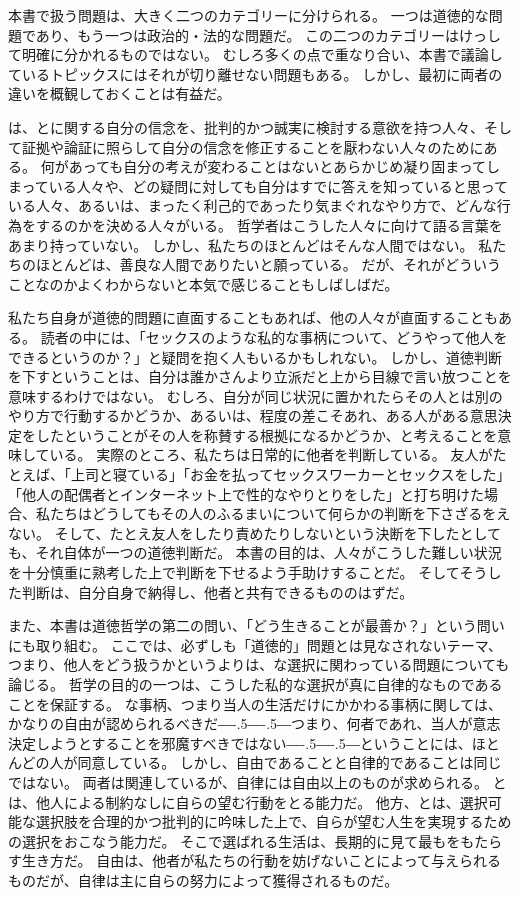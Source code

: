 \documentclass[paper=a4,book,openany]{jlreq}
\def\DDASH{―\kern-.5\zw―\kern-.5\zw―}
\begin{document}
本書で扱う問題は、大きく二つのカテゴリーに分けられる。
一つは道徳的な問題であり、もう一つは政治的・法的な問題だ。
この二つのカテゴリーはけっして明確に分かれるものではない。
むしろ多くの点で重なり合い、本書で議論しているトピックスにはそれが切り離せない問題もある。
しかし、最初に両者の違いを概観しておくことは有益だ。

は、とに関する自分の信念を、批判的かつ誠実に検討する意欲を持つ人々、そして証拠や論証に照らして自分の信念を修正することを厭わない人々のためにある。
何があっても自分の考えが変わることはないとあらかじめ凝り固まってしまっている人々や、どの疑問に対しても自分はすでに答えを知っていると思っている人々、あるいは、まったく利己的であったり気まぐれなやり方で、どんな行為をするのかを決める人々がいる。
哲学者はこうした人々に向けて語る言葉をあまり持っていない。
しかし、私たちのほとんどはそんな人間ではない。
私たちのほとんどは、善良な人間でありたいと願っている。
だが、それがどういうことなのかよくわからないと本気で感じることもしばしばだ。

私たち自身が道徳的問題に直面することもあれば、他の人々が直面することもある。
読者の中には、「セックスのような私的な事柄について、どうやって他人をできるというのか？」と疑問を抱く人もいるかもしれない。
しかし、道徳判断を下すということは、自分は誰かさんより立派だと上から目線で言い放つことを意味するわけではない。
むしろ、自分が同じ状況に置かれたらその人とは別のやり方で行動するかどうか、あるいは、程度の差こそあれ、ある人がある意思決定をしたということがその人を称賛する根拠になるかどうか、と考えることを意味している。
実際のところ、私たちは日常的に他者を判断している。
友人がたとえば、「上司と寝ている」「お金を払ってセックスワーカーとセックスをした」「他人の配偶者とインターネット上で性的なやりとりをした」と打ち明けた場合、私たちはどうしてもその人のふるまいについて何らかの判断を下さざるをえない。
そして、たとえ友人をしたり責めたりしないという決断を下したとしても、それ自体が一つの道徳判断だ。
本書の目的は、人々がこうした難しい状況を十分慎重に熟考した上で判断を下せるよう手助けすることだ。
そしてそうした判断は、自分自身で納得し、他者と共有できるもののはずだ。

また、本書は道徳哲学の第二の問い、「どう生きることが最善か？」という問いにも取り組む。
ここでは、必ずしも「道徳的」問題とは見なされないテーマ、つまり、他人をどう扱うかというよりは、な選択に関わっている問題についても論じる。
哲学の目的の一つは、こうした私的な選択が真に自律的なものであることを保証する。
な事柄、つまり当人の生活だけにかかわる事柄に関しては、かなりの自由が認められるべきだ{\DDASH}つまり、何者であれ、当人が意志決定しようとすることを邪魔すべきではない{\DDASH}ということには、ほとんどの人が同意している。
しかし、自由であることと自律的であることは同じではない。
両者は関連しているが、自律には自由以上のものが求められる。
とは、他人による制約なしに自らの望む行動をとる能力だ。
他方、とは、選択可能な選択肢を合理的かつ批判的に吟味した上で、自らが望む人生を実現するための選択をおこなう能力だ。
そこで選ばれる生活は、長期的に見て最もをもたらす生き方だ。
自由は、他者が私たちの行動を妨げないことによって与えられるものだが、自律は主に自らの努力によって獲得されるものだ。
\end{document}
